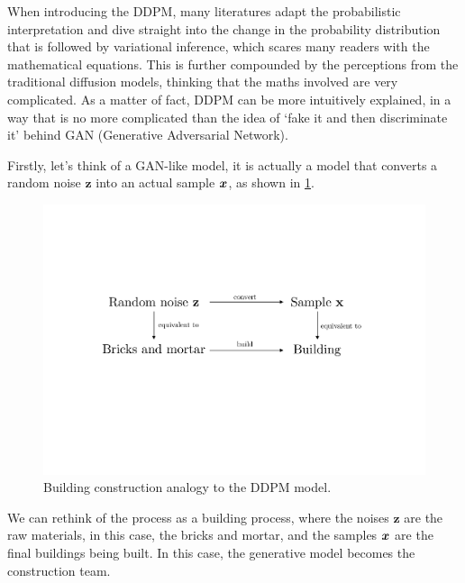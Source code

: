 When introducing the DDPM, many literatures adapt the probabilistic interpretation and dive straight into the change in the probability distribution that is followed by variational inference,  which  scares many readers with the mathematical equations. This is further compounded by the perceptions from the traditional diffusion models, thinking that the maths involved are very complicated. As a matter of fact, DDPM can be more intuitively explained, in a way that is no more complicated than the idea of `fake it and then discriminate it' behind GAN (Generative Adversarial Network).

Firstly, let's think of a GAN-like model, it is actually a model that converts a random noise $\bm{z}$  into an actual sample $\bm{x}$, as shown in \cref{fig:analogy}. 

\begin{figure}[h]
    \centering
    \includegraphics[width=0.5\linewidth]{loop.pdf}
    \caption{Building construction analogy to the DDPM model.}
    \label{fig:analogy}
\end{figure}

We can rethink of the process as a building process, where the noises $\bm{z}$ are the raw materials, in this case, the bricks and mortar, and the samples $\bm{x}$  are the final buildings being built. In this case, the generative model becomes the construction team. 

